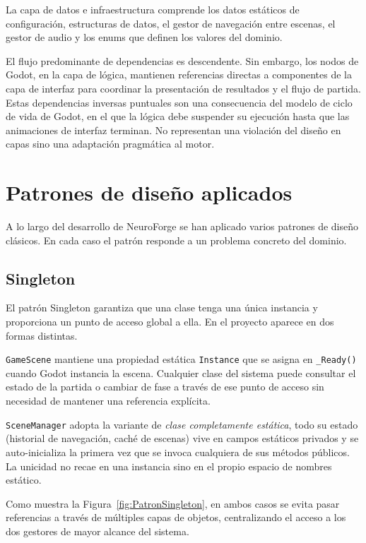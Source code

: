 La capa de datos e infraestructura comprende los datos estáticos de configuración, estructuras de datos, el gestor de navegación entre escenas, el gestor de audio y los enums que definen los valores del dominio.

El flujo predominante de dependencias es descendente. Sin embargo, los nodos de Godot, en la capa de lógica, mantienen referencias directas a componentes de la capa de interfaz para coordinar la presentación de resultados y el flujo de partida. Estas dependencias inversas puntuales son una consecuencia del modelo de ciclo de vida de Godot, en el que la lógica debe suspender su ejecución hasta que las animaciones de interfaz terminan. No representan una violación del diseño en capas sino una adaptación pragmática al motor.

\section{Patrones de diseño aplicados}

A lo largo del desarrollo de NeuroForge se han aplicado varios patrones de diseño clásicos. En cada caso el patrón responde a un problema concreto del dominio.

\subsection{Singleton}

El patrón Singleton garantiza que una clase tenga una única instancia y proporciona un punto de acceso global a ella. En el proyecto aparece en dos formas distintas.

\texttt{GameScene} mantiene una propiedad estática \texttt{Instance} que se asigna en \texttt{\_Ready()} cuando Godot instancia la escena. Cualquier clase del sistema puede consultar el estado de la partida o cambiar de fase a través de ese punto de acceso sin necesidad de mantener una referencia explícita.

\texttt{SceneManager} adopta la variante de \textit{clase completamente estática}, todo su estado (historial de navegación, caché de escenas) vive en campos estáticos privados y se auto-inicializa la primera vez que se invoca cualquiera de sus métodos públicos. La unicidad no recae en una instancia sino en el propio espacio de nombres estático.

Como muestra la Figura~\ref{fig:PatronSingleton}, en ambos casos se evita pasar referencias a través de múltiples capas de objetos, centralizando el acceso a los dos gestores de mayor alcance del sistema.

